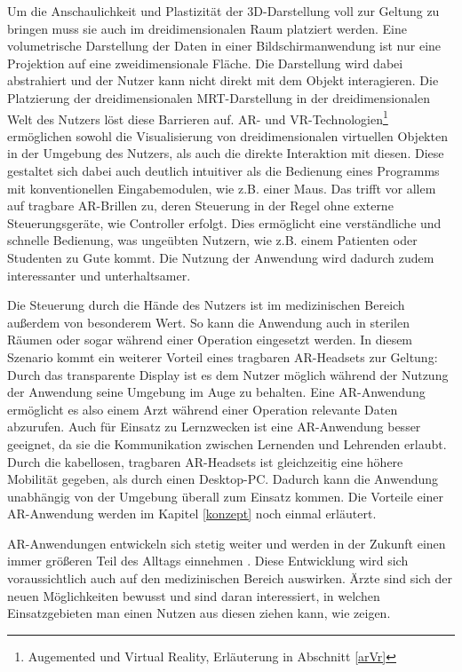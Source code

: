 Um die Anschaulichkeit und Plastizität der 3D-Darstellung voll zur Geltung zu bringen muss sie auch im dreidimensionalen Raum platziert werden. Eine volumetrische Darstellung der Daten in einer Bildschirmanwendung ist nur eine Projektion auf eine zweidimensionale Fläche. Die Darstellung wird dabei abstrahiert und der Nutzer kann nicht direkt mit dem Objekt interagieren.
Die Platzierung der dreidimensionalen MRT-Darstellung in der dreidimensionalen Welt des Nutzers löst diese Barrieren auf. AR- und VR-Technologien\footnote{Augemented und Virtual Reality, Erläuterung in Abschnitt \ref{arVr}} ermöglichen sowohl die Visualisierung von dreidimensionalen virtuellen Objekten in der Umgebung des Nutzers, als auch die direkte Interaktion mit diesen. Diese gestaltet sich dabei auch deutlich intuitiver als die Bedienung eines Programms mit konventionellen Eingabemodulen, wie z.B. einer Maus. Das trifft vor allem auf tragbare AR-Brillen zu, deren Steuerung in der Regel ohne externe Steuerungsgeräte, wie Controller erfolgt. Dies ermöglicht eine verständliche und schnelle Bedienung, was ungeübten Nutzern, wie z.B. einem Patienten oder Studenten zu Gute kommt. Die Nutzung der Anwendung wird dadurch zudem interessanter und unterhaltsamer.

Die Steuerung durch die Hände des Nutzers ist im medizinischen Bereich außerdem von besonderem Wert. So kann die Anwendung auch in sterilen Räumen oder sogar während einer Operation eingesetzt werden. In diesem Szenario kommt ein weiterer Vorteil eines tragbaren AR-Headsets zur Geltung: Durch das transparente Display ist es dem Nutzer möglich während der Nutzung der Anwendung seine Umgebung im Auge zu behalten. 
Eine AR-Anwendung ermöglicht es also einem Arzt während einer Operation relevante Daten abzurufen.
Auch für Einsatz zu Lernzwecken ist eine AR-Anwendung besser geeignet, da sie die Kommunikation zwischen Lernenden und Lehrenden erlaubt.
Durch die kabellosen, tragbaren AR-Headsets ist gleichzeitig eine höhere Mobilität gegeben, als durch einen Desktop-PC. Dadurch kann die Anwendung unabhängig von der Umgebung überall zum Einsatz kommen. 
Die Vorteile einer AR-Anwendung werden im Kapitel \ref{konzept} noch einmal erläutert.

AR-Anwendungen entwickeln sich stetig weiter und werden in der Zukunft einen immer größeren Teil des Alltags einnehmen \cite{forbes}. Diese Entwicklung wird sich voraussichtlich auch auf den medizinischen Bereich auswirken. 
Ärzte sind sich der neuen Möglichkeiten bewusst und sind daran interessiert, 
in welchen Einsatzgebieten man einen Nutzen aus diesen ziehen kann, wie \cite{holomed1} zeigen.

